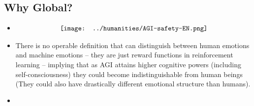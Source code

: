\begin{preview}
\begin{minipage}{\textwidth}
\begin{itemize}
		
\end{itemize}

\end{minipage}
\end{preview}

\begin{preview}
\begin{minipage}{\textwidth}
\setlength{\parskip}{0.4\baselineskip}
		
\section{Why Global?}

\begin{itemize}
	\item 
	\begin{equation}
	\nonumber
	\vcenter{\hbox{\texttt{[image: ../humanities/AGI-safety-EN.png]}}}
	\end{equation}
	
	\item There is no operable definition that can distinguish between human emotions and machine emotions -- they are just reward functions in reinforcement learning -- implying that as AGI attains higher cognitive powers (including self-consciousness) they could become indistinguishable from human beings (They could also have drastically different emotional structure than humans).
	
	\item 
\end{itemize}

\end{minipage}
\end{preview}


